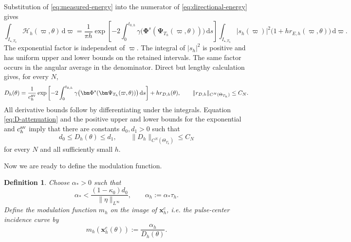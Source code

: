 \documentclass[11pt,reqno]{amsart}
\newtheorem{definition}{Definition}[section]
\newcommand{\dd}{\,\mathrm{d}}
\numberwithin{equation}{section}
\begin{document}
Substitution of \eqref{eq:measured-energy} into the numerator of \eqref{eq:directional-energy} gives
\begin{equation*}
 \int_{I_{\star,T_h}}\mathcal H_h(\varpi,\theta)\dd\varpi
 =\frac1{\pi h}\exp\left[-2\int_0^{t_{0,h}} \gamma\bigl(\bm\Phi^s(\bm\Psi_{T_h}(\varpi,\theta))\bigr)\dd s\right]
 \int_{I_{\star,T_h}}|s_h(\varpi)|^2\bigl(1+h r_{E,h}(\varpi,\theta)\bigr)\dd\varpi.
\end{equation*}
The exponential factor is independent of $\varpi$. The integral of $|s_h|^2$ is positive and has uniform upper and lower bounds on the retained intervals. The same factor occurs in the angular average in the denominator. Direct but lengthy calculation gives, for every $N$,
\begin{equation}\label{eq:D-attenuation}
 D_h(\theta)=\frac1{c_h^{\rm av}}\exp\left[-2\int_0^{t_{0,h}}
 \gamma\bigl(\bm\Phi^s(\bm\Psi_{T_h}(\varpi,\theta))\bigr)\dd s\right]
 +h r_{D,h}(\theta), \qquad \|r_{D,h}\|_{C^N(\Theta_{T_h})}\le C_N.
\end{equation}
All derivative bounds follow by differentiating under the integrals. Equation \eqref{eq:D-attenuation} and the positive upper and lower bounds for the exponential and $c_h^{\rm av}$ imply that there are constants $d_0,d_1>0$ such that
\begin{equation}\label{eq:direction-bounds}
 d_0\le D_h(\theta)\le d_1,
 \qquad
 \|D_h\|_{C^N(\Theta_{T_h})}\le C_N
\end{equation}
for every $N$ and all sufficiently small $h$.

Now we are ready to define the modulation function.
\begin{definition}
Choose $\alpha_*>0$ such that
\begin{equation*}
 \alpha_*<\frac{(1-\kappa_0)d_0}{\|\eta\|_{L^\infty}},
 \qquad
 \alpha_h:=\alpha_*\tau_h.
\end{equation*}
Define the modulation function $m_h$ on the image of $\bm x_h^c$, i.e. the pulse-center incidence curve by
\begin{equation}\label{eq:modulation-formula}
 m_h(\bm x_h^c(\theta)):=\frac{\alpha_h}{D_h(\theta)}.
\end{equation}
\end{definition}
\end{document}
